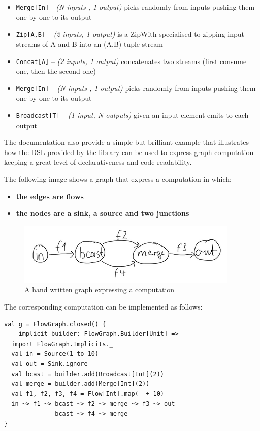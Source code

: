 \begin{itemize}
\itemsep1pt\parskip0pt
\item
  \texttt{Merge{[}In{]}} - \emph{(N inputs , 1 output)} picks randomly
  from inputs pushing them one by one to its output
\item
  \texttt{Zip{[}A,B{]}} -- \emph{(2 inputs, 1 output)} is a ZipWith
  specialised to zipping input streams of A and B into an (A,B) tuple
  stream
\item
  \texttt{Concat{[}A{]}} -- \emph{(2 inputs, 1 output)} concatenates two
  streams (first consume one, then the second one)
\item
  \texttt{Merge{[}In{]}} -- \emph{(N inputs , 1 output)} picks randomly
  from inputs pushing them one by one to its output
\item
  \texttt{Broadcast{[}T{]}} -- \emph{(1 input, N outputs)} given an
  input element emits to each output
\end{itemize}

The documentation also provide a simple but brilliant example that
illustrates how the DSL provided by the library can be used to express
graph computation keeping a great level of declarativeness and code
readability.

The following image shows a graph that express a computation in which:

\begin{itemize}
\itemsep1pt\parskip0pt
\item
  \textbf{the edges are flows}
\item
  \textbf{the nodes are a sink, a source and two junctions}
\end{itemize}

\begin{figure}[htbp]
\centering
\includegraphics[scale=0.75]{imgs/graph.png}
\caption{A hand written graph expressing a computation}
\end{figure}

The corresponding computation can be implemented as follows:

\begin{verbatim}
val g = FlowGraph.closed() { 
	implicit builder: FlowGraph.Builder[Unit] =>
  import FlowGraph.Implicits._
  val in = Source(1 to 10)
  val out = Sink.ignore
  val bcast = builder.add(Broadcast[Int](2))
  val merge = builder.add(Merge[Int](2))
  val f1, f2, f3, f4 = Flow[Int].map(_ + 10)
  in ~> f1 ~> bcast ~> f2 ~> merge ~> f3 ~> out
              bcast ~> f4 ~> merge
}
\end{verbatim}

